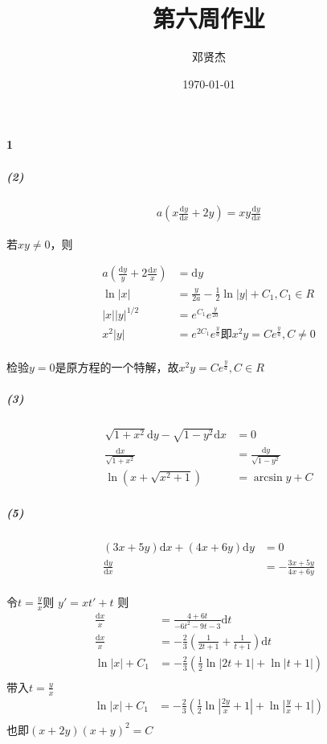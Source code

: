 \documentclass[UTF8]{ctexart}
\title{第六周作业}
\author{邓贤杰}
\date{\today}
\begin{document}
    \maketitle
    \paragraph*{1}
    \subparagraph{(2)}
    \begin{align*}
        a\left(x \frac{\mathrm{d}y}{\mathrm{d}x} + 2y\right) = xy \frac{\mathrm{d}y}{\mathrm{d}x}
    \end{align*}

    若$xy \ne 0$，则

    \begin{align*}
        a\left(\frac{\mathrm{d}y}{y} + 2 \frac{\mathrm{d}x}{x} \right) &= \mathrm{d}y\\
        \ln |x| &= \frac{y}{2a} - \frac{1}{2} \ln |y| + C_1, C_1 \in R\\
        |x||y|^{1/2} &= e^{C_1}e^{\frac{y}{2a}} \\
        x^2 |y|  &= e^{2C_1} e^{\frac{y}{a}} \text{即} x^2 y = Ce^{\frac{y}{a}} , C \ne 0\\
    \end{align*}

    检验$y=0$是原方程的一个特解，故$x^2 y  = Ce^{\frac{y}{a}}, C \in R$
    \subparagraph*{(3)}
    \begin{align*}
        \sqrt{1+x^2} \mathrm{d}y - \sqrt{1-y^2} \mathrm{d}x &= 0 \\
        \frac{\mathrm{d}x}{\sqrt{1+x^2}} &= \frac{\mathrm{d}y}{\sqrt{1-y^2} } \\
        \ln(x+\sqrt{x^2+1}) &= \arcsin y + C 
    \end{align*}
    \subparagraph*{(5)}
    \begin{align*}
        (3x+5y)\mathrm{d}x + (4x+6y)\mathrm{d}y &= 0 \\
        \frac{\mathrm{d}y}{\mathrm{d}x} &=-\frac{3x+5y}{4x+6y}  \\
    \end{align*}
    
        令$t = \frac{y}{x}$则 $y' = xt'+t$
        则
    \begin{align*}
        \frac{\mathrm{d}x}{x} &= \frac{4+6t}{-6t^2-9t-3}\mathrm{d}t \\ 
         \frac{\mathrm{d}x}{x} &= -\frac{2}{3} \left( \frac{1}{2t+1} + \frac{1}{t+1} \right)\mathrm{d}t \\
         \ln|x| + C_1 &= -\frac{2}{3} ( \frac{1}{2} \ln|2t+1|+\ln|t+1|) \\
    \end{align*}
        带入$t = \frac{y}{x}$  \\
    \begin{align*}
        \ln|x| + C_1 &= -\frac{2}{3} \left( \frac{1}{2} \ln|\frac{2y}{x} +1|+\ln| \frac{y}{x} +1|\right) \\
    \end{align*}
        也即$(x+2y)(x+y)^2 = C$
\end{document}
